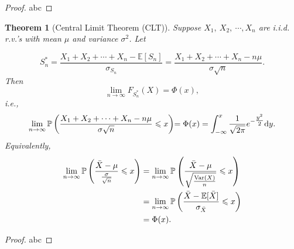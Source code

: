 \documentclass[openany,12pt]{book}
\newtheorem{theorem}{Theorem}[chapter]
\newtheorem{corollary}{Corollary}[chapter]
\newtheorem{remark}{Remark}[chapter]
\newtheorem{lemma}{Lemma}[chapter]
\newtheorem{definition}{Definition}[chapter]
\begin{document}
\begin{proof}
  abc
\end{proof}

\begin{theorem}[Central Limit Theorem (CLT)]
Suppose $X_{1},\ X_{2},\ \cdots,X_{n}$ are i.i.d. r.v.'s with mean $\mu$ and variance $\sigma^{2}$. Let

\[S_{n}^{*} = \frac{X_{1} + X_{2} + \cdots + X_{n} - \mathbb{E}[S_{n}]}{\sigma_{S_{n}}} = \frac{X_{1} + X_{2} + \cdots + X_{n} - n\mu}{\sigma\sqrt{n}}.\]
Then
\[\lim_{n \to \infty}{F_{S_{n}^{*}}(X) = \Phi(x)},\]
i.e.,
\[{\lim_{n \to \infty}\mathbb{P}\left( \frac{X_{1} + X_{2} + \cdots + X_{n} - n\mu}{\sigma\sqrt{n}} \leqslant x \right)}{= \Phi(x)} = \int_{- \infty}^{x}\frac{1}{\sqrt{2\pi}}e^{- \tfrac{y^{2}}{2}}\mathrm{d} y.\]
Equivalently,
\[\begin{aligned}
{\lim_{n \to \infty}\mathbb{P}\left( \frac{\bar{X} - \mu}{\frac{\sigma}{\sqrt{n}}} \leqslant x \right)}&= \lim_{n \to \infty}\mathbb{P}\left( \frac{\bar{X} - \mu}{\sqrt{\frac{\mathrm{Var}(X)}{n}}} \leqslant x \right)\\
& = \lim_{n \to \infty}\mathbb{P}\left( \frac{\bar{X} - \mathbb{E}[\bar{X}]}{\sigma_{\bar{X}}} \leqslant x \right) \\
&= \Phi(x).\\
\end{aligned}\]
\end{theorem}

\begin{proof}
  abc
\end{proof}


%
%
%
%
%
%
%
%
%
%
%
%
%
\end{document}
